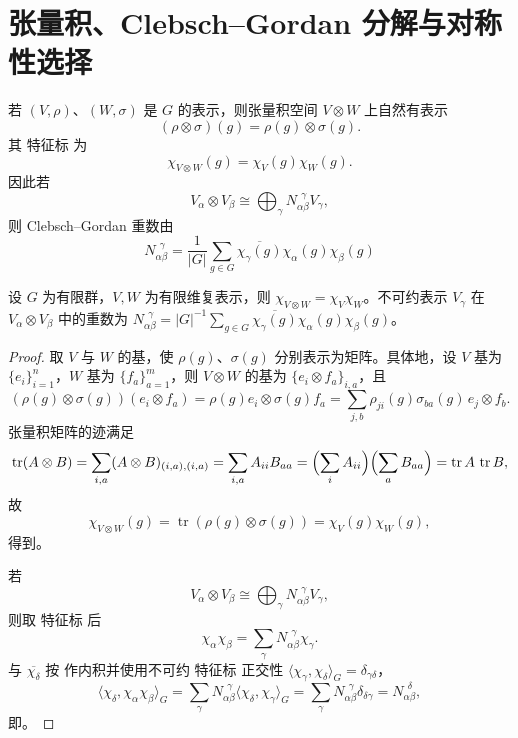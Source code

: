 \section{张量积、Clebsch--Gordan 分解与对称性选择}
\label{sec:tensor-product-representations}
若 $(V,\rho)$、$(W,\sigma)$ 是 $G$ 的表示，则张量积空间 $V\otimes W$ 上自然有表示
\[
(\rho\otimes\sigma)(g)
=\rho(g)\otimes\sigma(g).
\]
其 特征标 为
\begin{equation}
\chi_{V\otimes W}(g)
=\chi_V(g)\chi_W(g).
\label{eq:tensor-character-product}
\end{equation}
因此若
\[
V_\alpha\otimes V_\beta
\cong
\bigoplus_\gamma
N_{\alpha\beta}^{\ \ \gamma}V_\gamma,
\]
则 Clebsch--Gordan 重数由
\begin{equation}
N_{\alpha\beta}^{\ \ \gamma}
=
\frac1{|G|}
\sum_{g\in G}
\overline{\chi_\gamma(g)}
\chi_\alpha(g)\chi_\beta(g)
\label{eq:cg-character-multiplicity}
\end{equation}

\begin{proposition}[张量积特征标与耦合重数]
设 $G$ 为有限群，$V,W$ 为有限维复表示，则 $\chi_{V\otimes W}=\chi_V\chi_W$。不可约表示 $V_\gamma$ 在 $V_\alpha\otimes V_\beta$ 中的重数为 $N_{\alpha\beta}^{\ \ \gamma}=|G|^{-1}\sum_{g\in G}\overline{\chi_\gamma(g)}\chi_\alpha(g)\chi_\beta(g)$。
\end{proposition}
\begin{proof}
取 $V$ 与 $W$ 的基，使 $\rho(g)$、$\sigma(g)$ 分别表示为矩阵。具体地，设 $V$ 基为 $\{e_i\}_{i=1}^n$，$W$ 基为 $\{f_a\}_{a=1}^m$，则 $V\otimes W$ 的基为 $\{e_i\otimes f_a\}_{i,a}$，且
\[
(\rho(g)\otimes\sigma(g))(e_i\otimes f_a)
=\rho(g)e_i\otimes\sigma(g)f_a
=\sum_{j,b}\rho_{ji}(g)\sigma_{ba}(g)\,e_j\otimes f_b.
\]
张量积矩阵的迹满足
\[
\operatorname{tr}(A\otimes B)
=\sum_{i,a}(A\otimes B)_{(i,a),(i,a)}
=\sum_{i,a}A_{ii}B_{aa}
=\Bigl(\sum_i A_{ii}\Bigr)\Bigl(\sum_a B_{aa}\Bigr)
=\operatorname{tr}A\,\operatorname{tr}B,
\]
故
\[
\chi_{V\otimes W}(g)
=
\operatorname{tr}(\rho(g)\otimes\sigma(g))
=
\chi_V(g)\chi_W(g),
\]
得到。

若
\[
V_\alpha\otimes V_\beta
\cong
\bigoplus_\gamma N_{\alpha\beta}^{\ \ \gamma}V_\gamma,
\]
则取 特征标 后
\[
\chi_\alpha\chi_\beta
=
\sum_\gamma N_{\alpha\beta}^{\ \ \gamma}\chi_\gamma.
\]
与 $\overline{\chi_\delta}$ 按 作内积并使用不可约 特征标 正交性 $\langle\chi_\gamma,\chi_\delta\rangle_G=\delta_{\gamma\delta}$，
\[
\langle\chi_\delta,\chi_\alpha\chi_\beta\rangle_G
=\sum_\gamma N_{\alpha\beta}^{\ \ \gamma}\langle\chi_\delta,\chi_\gamma\rangle_G
=\sum_\gamma N_{\alpha\beta}^{\ \ \gamma}\delta_{\delta\gamma}
=N_{\alpha\beta}^{\ \ \delta},
\]
即。
\end{proof}


